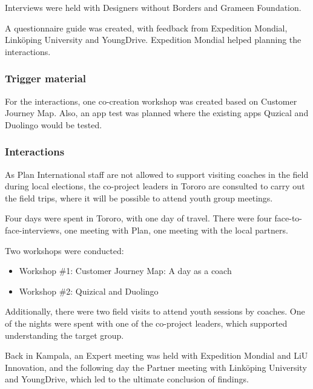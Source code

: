 Interviews were held with Designers without Borders and Grameen Foundation.

A questionnaire guide was created, with feedback from Expedition Mondial, Linköping University and YoungDrive. Expedition Mondial helped planning the interactions.

\subsubsection{Trigger material}
For the interactions, one co-creation workshop was created based on Customer Journey Map. Also, an app test was planned where the existing apps Quzical and Duolingo would be tested.

\subsubsection{Interactions}

As Plan International staff are not allowed to support visiting coaches in the field during local elections, the co-project leaders in Tororo are consulted to carry out the field trips, where it will be possible to attend youth group meetings.

Four days were spent in Tororo, with one day of travel. There were four face-to-face-interviews,
one meeting with Plan, one meeting with the local partners.

Two workshops were conducted:
\begin{itemize}
\item Workshop \#1: Customer Journey Map: A day as a coach
\item Workshop \#2: Quizical and Duolingo
\end{itemize}

Additionally, there were two field visits to attend youth sessions by coaches. One of the nights were spent with one of the co-project leaders, which supported understanding the target group.

Back in Kampala, an Expert meeting was held with Expedition Mondial and LiU Innovation, and the following day the Partner meeting with Linköping University and YoungDrive, which led to the ultimate conclusion of findings.
